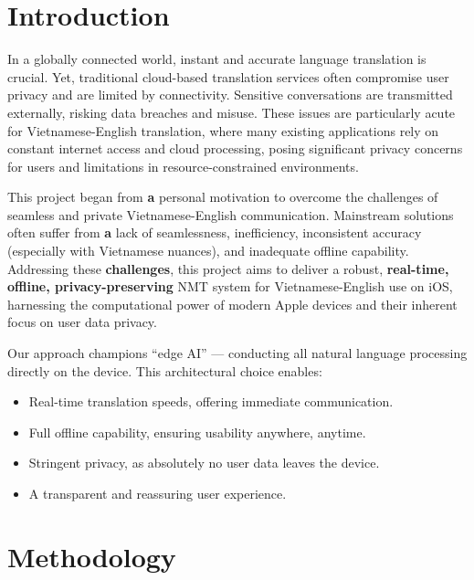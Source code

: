 \documentclass[12pt]{article}
\begin{document}
\tableofcontents

\newpage

\section{Introduction}

In a globally connected world, instant and accurate language translation is crucial. Yet, traditional cloud-based translation services often compromise user privacy and are limited by connectivity. Sensitive conversations are transmitted externally, risking data breaches and misuse. These issues are particularly acute for Vietnamese-English translation, where many existing applications rely on constant internet access and cloud processing, posing significant privacy concerns for users and limitations in resource-constrained environments.

This project began from \textbf{a} personal motivation to overcome the challenges of seamless and private Vietnamese-English communication. Mainstream solutions often suffer from \textbf{a} lack of seamlessness, inefficiency, inconsistent accuracy (especially with Vietnamese nuances), and inadequate offline capability. Addressing these \textbf{challenges}, this project aims to deliver a robust, \textbf{real-time, offline, privacy-preserving} NMT system for Vietnamese-English use on iOS, harnessing the computational power of modern Apple devices and their inherent focus on user data privacy.

Our approach champions ``edge AI'' — conducting all natural language processing directly on the device. This architectural choice enables:

\begin{itemize}
    \item Real-time translation speeds, offering immediate communication.
    \item Full offline capability, ensuring usability anywhere, anytime.
    \item Stringent privacy, as absolutely no user data leaves the device.
    \item A transparent and reassuring user experience.
\end{itemize}

\section{Methodology}
\end{document}
